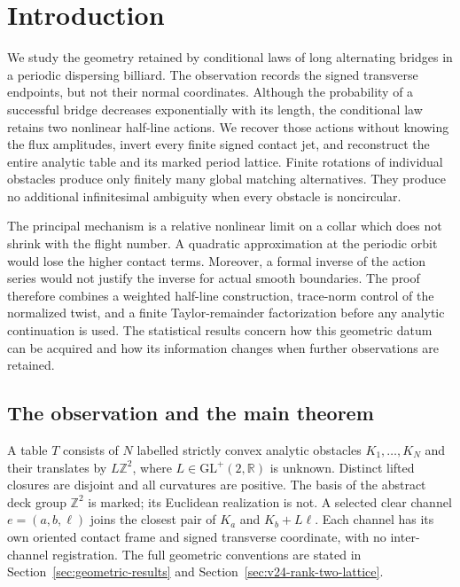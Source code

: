 \section{Introduction}
\label{sec:v48-introduction}

We study the geometry retained by conditional laws of long alternating
bridges in a periodic dispersing billiard.  The observation records the
signed transverse endpoints, but not their normal coordinates.  Although
the probability of a successful bridge decreases exponentially with its
length, the conditional law retains two nonlinear half-line actions.
We recover those actions without knowing the flux amplitudes, invert every
finite signed contact jet, and reconstruct the entire analytic table and
its marked period lattice.  Finite rotations of individual obstacles
produce only finitely many global matching alternatives.  They produce
no additional infinitesimal ambiguity when every obstacle is noncircular.

The principal mechanism is a relative nonlinear limit on a collar which
does not shrink with the flight number.  A quadratic approximation at the
periodic orbit would lose the higher contact terms.  Moreover, a formal
inverse of the action series would not justify the inverse for actual
smooth boundaries.  The proof therefore combines a weighted half-line
construction, trace-norm control of the normalized twist, and a finite
Taylor-remainder factorization before any analytic continuation is used.
The statistical results concern how this geometric datum can be acquired
and how its information changes when further observations are retained.

\subsection{The observation and the main theorem}

A table $T$ consists of $N$ labelled strictly convex analytic obstacles
$K_1,\ldots,K_N$ and their translates by $L\mathbb Z^2$, where
$L\in\mathrm{GL}^+(2,\mathbb R)$ is unknown.  Distinct lifted closures
are disjoint and all curvatures are positive.  The basis of the abstract
deck group $\mathbb Z^2$ is marked; its Euclidean realization is not.
A selected clear channel $e=(a,b,\ell)$ joins the closest pair of
$K_a$ and $K_b+L\ell$.  Each channel has its own oriented contact frame
and signed transverse coordinate, with no inter-channel registration.
The full geometric conventions are stated in
Section~\ref{sec:geometric-results} and
Section~\ref{sec:v24-rank-two-lattice}.

